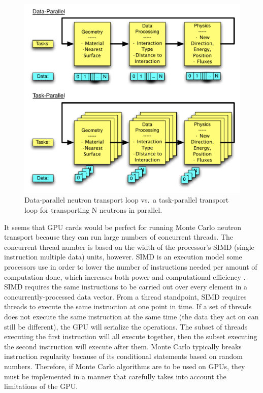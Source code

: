 \documentclass[preprint,12pt]{elsarticle}
\begin{document}
\begin{figure}[h!] 
  \centering
    \includegraphics[width=\textwidth]{graphics/datavtask.pdf}
     \caption{Data-parallel neutron transport loop vs.\ a task-parallel transport loop for transporting N neutrons in parallel.  \label{datavtask} }
\end{figure}


It seems that GPU cards would be perfect for running Monte Carlo neutron transport because they can run large numbers of concurrent threads.  The concurrent thread number is based on the width of the processor's SIMD (single instruction multiple data) units, however.  SIMD is an execution model some processors use in order to lower the number of instructions needed per amount of computation done, which increases both power and computational efficiency \cite{simd_power}.  SIMD requires the same instructions to be carried out over every element in a concurrently-processed data vector.  From a thread standpoint, SIMD requires threads to execute the same instruction at one point in time.  If a set of threads does not execute the same instruction at the same time (the data they act on can still be different), the GPU will serialize the operations.  The subset of threads executing the first instruction will all execute together, then the subset executing the second instruction will execute after them.  Monte Carlo typically breaks instruction regularity because of its conditional statements based on random numbers.  Therefore, if Monte Carlo algorithms are to be used on GPUs, they must be implemented in a manner that carefully takes into account the limitations of the GPU.
\end{document}
